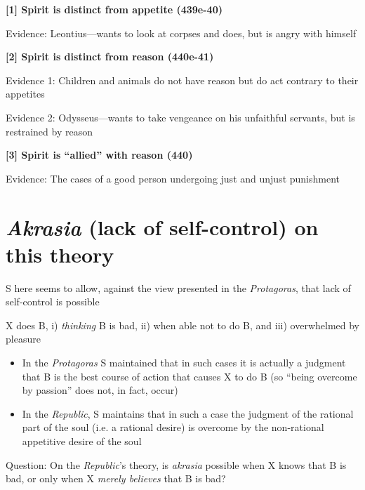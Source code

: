 \documentclass[11pt]{article}
\begin{document}
\noindent\textbf{[1] Spirit is distinct from appetite (439e-40)}
\vspace*{1mm}

\hspace*{3mm} Evidence: Leontius---wants to look at corpses and does, but is angry with himself
\vspace*{1mm}

\noindent\textbf{[2] Spirit is distinct from reason (440e-41)}
\vspace*{1mm}

\hspace*{3mm} Evidence 1: Children and animals do not have reason but do act contrary to their appetites
\vspace*{.5mm}

\hspace*{3mm} Evidence 2: Odysseus---wants to take vengeance on his unfaithful servants, but is restrained by reason
\newpage

\noindent\textbf{[3] Spirit is ``allied'' with reason (440)}
\vspace*{1mm}

\hspace*{3mm} Evidence: The cases of a good person undergoing just and unjust punishment

\section*{\emph{Akrasia} (lack of self-control) on this theory}

\noindent S here seems to allow, against the view presented in the \emph{Protagoras}, that lack of self-control is possible
\vspace*{2mm}

\noindent X does B, i) \emph{thinking} B is bad, ii) when able not to do B, and iii) overwhelmed by pleasure

\begin{itemize}\item{In the \emph{Protagoras} S maintained that in such cases it is actually a judgment that B is the best course of action that causes X to do B (so ``being overcome by passion'' does not, in fact, occur)}\item{In the \emph{Republic}, S maintains that in such a case the judgment of the rational part of the soul (i.e. a rational desire) is overcome by the non-rational appetitive desire of the soul}\end{itemize}

\noindent Question: On the \emph{Republic}'s theory, is \emph{akrasia} possible when X knows that B is bad, or only when X \emph{merely believes} that B is bad?
\end{document}
